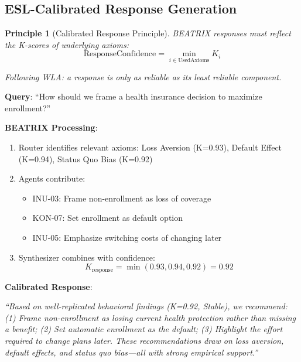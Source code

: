 \documentclass[11pt,a4paper]{article}
\newtheorem{principle}{Principle}[section]
\theoremstyle{remark}
\begin{document}
\subsection{ESL-Calibrated Response Generation}

\begin{principle}[Calibrated Response Principle]
\label{princ:calibrated-response}
BEATRIX responses must reflect the K-scores of underlying axioms:
\begin{equation}
\text{ResponseConfidence} = \min_{i \in \text{UsedAxioms}} K_i
\end{equation}

Following WLA: a response is only as reliable as its least reliable component.
\end{principle}

\begin{examplebox}[title={BEATRIX Query Example}]
\textbf{Query}: ``How should we frame a health insurance decision to maximize enrollment?''

\textbf{BEATRIX Processing}:
\begin{enumerate}
    \item Router identifies relevant axioms: Loss Aversion (K=0.93), Default Effect (K=0.94), Status Quo Bias (K=0.92)

    \item Agents contribute:
    \begin{itemize}
        \item INU-03: Frame non-enrollment as loss of coverage
        \item KON-07: Set enrollment as default option
        \item INU-05: Emphasize switching costs of changing later
    \end{itemize}

    \item Synthesizer combines with confidence:
    \begin{equation}
    K_{\text{response}} = \min(0.93, 0.94, 0.92) = 0.92
    \end{equation}
\end{enumerate}

\textbf{Calibrated Response}:

\textit{``Based on well-replicated behavioral findings (K=0.92, Stable), we recommend: (1) Frame non-enrollment as losing current health protection rather than missing a benefit; (2) Set automatic enrollment as the default; (3) Highlight the effort required to change plans later. These recommendations draw on loss aversion, default effects, and status quo bias---all with strong empirical support.''}
\end{examplebox}
\end{document}
